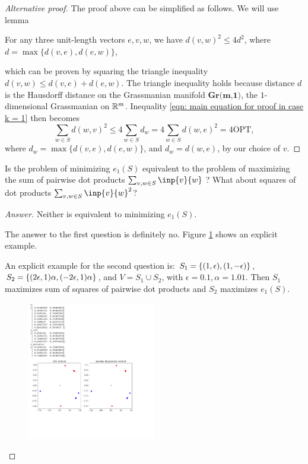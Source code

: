 \documentclass{article}
\begin{document}
\begin{proof}[Alternative proof]
The proof above can be simplified as follows. We will use lemma
\begin{lemma}
For any three unit-length vectors $e,v,w$, we have $d(v,w)^2\leq 4d^2$, where $d = \max\{d(v,e),d(e,w)\}$,
\end{lemma}
which can be proven by squaring the triangle inequality $d(v,w)\leq d(v,e)+d(e,w)$. The triangle inequality holds because distance $d$ is the Hausdorff distance on the Grassmanian manifold $\textbf{Gr(m,1)}$, the $1$-dimensional Grassmanian on $\mathbb{R}^m$. Inequality \ref{eqn: main equation for proof in case k = 1} then becomes
\begin{equation}
    \sum_{w\in S}d(w,v)^2\leq 4\sum_{w\in S}d_w = 4\sum_{w\in S}d(w,e)^2 = 4\text{OPT},
\end{equation}
where $d_w = \max\{d(v,e),d(e,w)\}$, and $d_w = d(w,e)$, by our choice of $v$.
\end{proof}

\begin{question}
    Is the problem of minimizing $e_1(S)$ equivalent to the problem of maximizing the sum of pairwise dot products $\sum_{v,w\in S}\inp{v}{w}$ ? What about squares of dot products $\sum_{v,w\in S}\inp{v}{w}^2$?
\end{question}

\begin{proof}[Answer]\label{Q: pairwise inner products and rank-1 approximation}
Neither is equivalent to minimizing $e_1(S)$.

The answer to the first question is definitely no. Figure \ref{fig: not equivalent} shows an explicit example.

An explicit example for the second question is: $S_1 = \left\{(1,\epsilon),(1,-\epsilon)\right\}$, $S_2 = \left\{(2\epsilon, 1)\alpha,(-2\epsilon, 1)\alpha\right\}$, and $V = S_1\cup S_2$, with $\epsilon = 0.1, \alpha = 1.01.$ Then $S_1$ maximizes sum of squares of pairwise dot products and $S_2$ maximizes $e_1(S).$
\begin{figure}
 \flushright
 \caption{\label{fig: not equivalent}}
 \includegraphics[width=0.5\textwidth]{images/not_equivalent.png}
\end{figure}
\end{proof}
\end{document}
